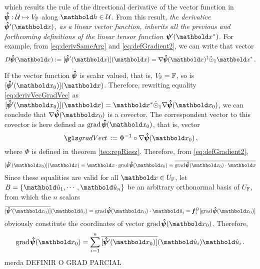 which results the rule of the directional derivative of the vector function in $\pmb{\hat\psi} : \mathcal{U} \mapsto V_{\mathbb{F}}$ along $\vto{h}\in\mathcal{U}$. From this result, \emph{the derivative $\tnr{\hat\psi}'(\vto{x})$, as a linear vector function, inherits all the previous and forthcoming definitions of the linear tensor function $\fua{\tnr{\psi}'}{\vto{x}^*}$}. For example, from \eqref{eq:derivSameArg} and \eqref{eq:defGradient2}, we can write that vector
\begin{equation}\label{eq:derivSameArg2}
\fua{D\tnr{\hat\psi}}{\vto{x}} := \fua{[\tnr{\hat\psi}'(\vto{x})]}{\vto{x}}=\fua{ \nabla\tnr{\hat{\psi}}}{\vto{x}}^\dagger\hat{\odot}_1\vto{x}^*\,.
\end{equation}


If the vector function $\pmb{\hat\psi}$ is scalar valued, that is, $V_{\mathbb{F}}=\mathbb{F}$, so is $\fua{[\tnr{\hat\psi}'(\vto{x}_0)]}{\vto{x}}$. Therefore, rewriting equality \eqref{eq:derivVecGradVec} as $\fua{[\tnr{\hat\psi}'(\vto{x}_0)]}{\vto{x}} = \vto{x}^*\hat{\odot}_1\fua{ \nabla\tnr{\hat{\psi}}}{\vto{x}_0}$, we can conclude that $\fua{\nabla\tnr{\hat{\psi}}}{\vto{x}_0}$ is a covector. The correspondent vector to this covector is here defined as $\fua{\grad{\tnr{\hat{\psi}}}}{\vto{x}_0}$, that is, vector      
\begin{equation}
\gloref{gradVect}:=\Phi^{-1}\circ\fua{\nabla\tnr{\hat{\psi}}}{\vto{x}_0}\,,
\end{equation}
where $\Phi$ is defined in theorem \ref{teo:repRiesz}. Therefore, from \eqref{eq:defGradient2},
\begin{equation}\label{eq:gradScalVectFunc}
\fua{[\tnr{\hat\psi}'(\vto{x}_0)]}{\vto{x}} = \vto{x}\cdot\fua{\grad{\tnr{\hat{\psi}}}}{\vto{x}_0}=\overline{\fua{\grad{\tnr{\hat{\psi}}}}{\vto{x}_0}\cdot\vto{x}}
\end{equation}
Since these equalities are valid for all $\vto{x}\in U_\cam{F}$, let $B=\{\vun{u}_1,\cdots,\vun{u}_n\}$ be an arbitrary orthonormal basis of $U_{\mathbb{F}}$, from which the $n$ scalars
\begin{equation*}
\fua{\overline{[\tnr{\hat\psi}'(\vto{x}_0)]}}{\vun{u}_i} = \fua{\grad{\tnr{\hat{\psi}}}}{\vto{x}_0}\cdot\vun{u}_i=\vtf{f}_i^{B}[\fua{\grad{\tnr{\hat{\psi}}}}{\vto{x}_0}]
\end{equation*}
obviously constitute the coordinates of vector $\fua{\grad{\tnr{\hat{\psi}}}}{\vto{x}_0}$. Therefore, 
\begin{equation}
\fua{\grad{\tnr{\hat{\psi}}}}{\vto{x}_0} = \sum_{i=1}^n\fua{\overline{[\tnr{\hat\psi}'(\vto{x}_0)]}}{\vun{u}_i}\vun{u}_i\,.
\end{equation}
merda DEFINIR O GRAD PARCIAL



